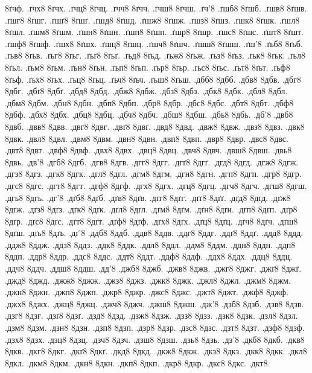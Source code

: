 {8ґчф.
.ґчх8
8ґчх.
.ґчц8
8ґчц.
.ґчч8
8ґчч.
.ґчш8
8ґчш.
.ґч'8
.ґшб8
8ґшб.
.ґшв8
8ґшв.
.ґшг8
8ґшг.
.ґшґ8
8ґшґ.
.ґшд8
8ґшд.
.ґшж8
8ґшж.
.ґшз8
8ґшз.
.ґшк8
8ґшк.
.ґшл8
8ґшл.
.ґшм8
8ґшм.
.ґшн8
8ґшн.
.ґшп8
8ґшп.
.ґшр8
8ґшр.
.ґшс8
8ґшс.
.ґшт8
8ґшт.
.ґшф8
8ґшф.
.ґшх8
8ґшх.
.ґшц8
8ґшц.
.ґшч8
8ґшч.
.ґшш8
8ґшш.
.ґш'8
.ґьб8
8ґьб.
.ґьв8
8ґьв.
.ґьг8
8ґьг.
.ґьґ8
8ґьґ.
.ґьд8
8ґьд.
.ґьж8
8ґьж.
.ґьз8
8ґьз.
.ґьк8
8ґьк.
.ґьл8
8ґьл.
.ґьм8
8ґьм.
.ґьн8
8ґьн.
.ґьп8
8ґьп.
.ґьр8
8ґьр.
.ґьс8
8ґьс.
.ґьт8
8ґьт.
.ґьф8
8ґьф.
.ґьх8
8ґьх.
.ґьц8
8ґьц.
.ґьч8
8ґьч.
.ґьш8
8ґьш.
.дбб8
8дбб.
.дбв8
8дбв.
.дбг8
8дбг.
.дбґ8
8дбґ.
.дбд8
8дбд.
.дбж8
8дбж.
.дбз8
8дбз.
.дбк8
8дбк.
.дбл8
8дбл.
.дбм8
8дбм.
.дбн8
8дбн.
.дбп8
8дбп.
.дбр8
8дбр.
.дбс8
8дбс.
.дбт8
8дбт.
.дбф8
8дбф.
.дбх8
8дбх.
.дбц8
8дбц.
.дбч8
8дбч.
.дбш8
8дбш.
.дбь8
8дбь.
.дб'8
.двб8
8двб.
.двв8
8двв.
.двг8
8двг.
.двґ8
8двґ.
.двд8
8двд.
.двж8
8двж.
.двз8
8двз.
.двк8
8двк.
.двл8
8двл.
.двм8
8двм.
.двн8
8двн.
.двп8
8двп.
.двр8
8двр.
.двс8
8двс.
.двт8
8двт.
.двф8
8двф.
.двх8
8двх.
.двц8
8двц.
.двч8
8двч.
.двш8
8двш.
.двь8
8двь.
.дв'8
.дгб8
8дгб.
.дгв8
8дгв.
.дгг8
8дгг.
.дгґ8
8дгґ.
.дгд8
8дгд.
.дгж8
8дгж.
.дгз8
8дгз.
.дгк8
8дгк.
.дгл8
8дгл.
.дгм8
8дгм.
.дгн8
8дгн.
.дгп8
8дгп.
.дгр8
8дгр.
.дгс8
8дгс.
.дгт8
8дгт.
.дгф8
8дгф.
.дгх8
8дгх.
.дгц8
8дгц.
.дгч8
8дгч.
.дгш8
8дгш.
.дгь8
8дгь.
.дг'8
.дґб8
8дґб.
.дґв8
8дґв.
.дґг8
8дґг.
.дґґ8
8дґґ.
.дґд8
8дґд.
.дґж8
8дґж.
.дґз8
8дґз.
.дґк8
8дґк.
.дґл8
8дґл.
.дґм8
8дґм.
.дґн8
8дґн.
.дґп8
8дґп.
.дґр8
8дґр.
.дґс8
8дґс.
.дґт8
8дґт.
.дґф8
8дґф.
.дґх8
8дґх.
.дґц8
8дґц.
.дґч8
8дґч.
.дґш8
8дґш.
.дґь8
8дґь.
.дґ'8
.ддб8
8ддб.
.ддв8
8ддв.
.ддг8
8ддг.
.ддґ8
8ддґ.
.ддд8
8ддд.
.ддж8
8ддж.
.ддз8
8ддз.
.ддк8
8ддк.
.ддл8
8ддл.
.ддм8
8ддм.
.ддн8
8ддн.
.ддп8
8ддп.
.ддр8
8ддр.
.ддс8
8ддс.
.ддт8
8ддт.
.ддф8
8ддф.
.ддх8
8ддх.
.ддц8
8ддц.
.ддч8
8ддч.
.ддш8
8ддш.
.дд'8
.джб8
8джб.
.джв8
8джв.
.джг8
8джг.
.джґ8
8джґ.
.джд8
8джд.
.джж8
8джж.
.джз8
8джз.
.джк8
8джк.
.джл8
8джл.
.джм8
8джм.
.джн8
8джн.
.джп8
8джп.
.джр8
8джр.
.джс8
8джс.
.джт8
8джт.
.джф8
8джф.
.джх8
8джх.
.джц8
8джц.
.джч8
8джч.
.джш8
8джш.
.дж'8
.дзб8
8дзб.
.дзв8
8дзв.
.дзг8
8дзг.
.дзґ8
8дзґ.
.дзд8
8дзд.
.дзж8
8дзж.
.дзз8
8дзз.
.дзк8
8дзк.
.дзл8
8дзл.
.дзм8
8дзм.
.дзн8
8дзн.
.дзп8
8дзп.
.дзр8
8дзр.
.дзс8
8дзс.
.дзт8
8дзт.
.дзф8
8дзф.
.дзх8
8дзх.
.дзц8
8дзц.
.дзч8
8дзч.
.дзш8
8дзш.
.дзь8
8дзь.
.дз'8
.дкб8
8дкб.
.дкв8
8дкв.
.дкг8
8дкг.
.дкґ8
8дкґ.
.дкд8
8дкд.
.дкж8
8дкж.
.дкз8
8дкз.
.дкк8
8дкк.
.дкл8
8дкл.
.дкм8
8дкм.
.дкн8
8дкн.
.дкп8
8дкп.
.дкр8
8дкр.
.дкс8
8дкс.
.дкт8
}
